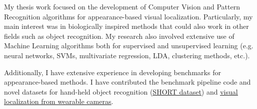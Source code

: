My thesis work focused on the development of Computer Vision and Pattern Recognition
algorithms for appearance-based visual localization. Particularly, my main interest was
in biologically inspired methods that could also work in other fields such as object
recognition. My research also involved extensive use of Machine Learning algorithms
both for supervised and unsupervised learning (e.g. neural networks, SVMs, multivariate
regression, LDA, clustering methods, etc.).

Additionally, I have extensive experience in developing benchmarks for appearance-based
methods. I have contributed the benchmark pipeline code and novel datasets for hand-held
object recognition (\underline{\href{http://www.bicv.org/datasets/short-100/}{SHORT dataset}})
and 
\underline{\href{http://www.bici-lab.org/projects/visual-paths-navigation/}
{visual localization from wearable
cameras}}.

